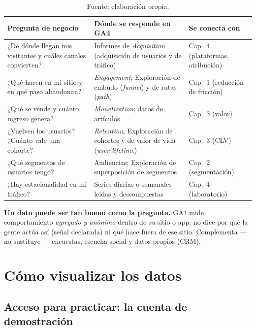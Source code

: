 \documentclass[11pt,letterpaper]{article}
\begin{document}
\begin{table}[h]
\centering
\small
\begin{tabularx}{\textwidth}{@{}>{\raggedright\arraybackslash}p{4.4cm}>{\raggedright\arraybackslash}X>{\raggedright\arraybackslash}p{2.9cm}@{}}
\toprule
\textbf{Pregunta de negocio} & \textbf{Dónde se responde en GA4} & \textbf{Se conecta con} \\
\midrule
¿De dónde llegan mis visitantes y cuáles canales convierten? & Informes de \emph{Acquisition} (adquisición de usuarios y de tráfico) & Cap.~4 (plataformas, atribución) \\
¿Qué hacen en mi sitio y en qué paso abandonan? & \emph{Engagement}; Exploración de embudo (\emph{funnel}) y de rutas (\emph{path}) & Cap.~1 (reducción de fricción) \\
¿Qué se vende y cuánto ingreso genera? & \emph{Monetization}; datos de artículos & Cap.~3 (valor) \\
¿Vuelven los usuarios? ¿Cuánto vale una cohorte? & \emph{Retention}; Exploración de cohortes y de valor de vida (\emph{user lifetime}) & Cap.~3 (CLV) \\
¿Qué segmentos de usuarios tengo? & Audiencias; Exploración de superposición de segmentos & Cap.~2 (segmentación) \\
¿Hay estacionalidad en mi tráfico? & Series diarias o semanales leídas y descompuestas & Cap.~4 (laboratorio) \\
\bottomrule
\end{tabularx}
\caption*{Fuente: elaboración propia.}
\end{table}

\begin{cajaNota}
\textbf{Un dato puede ser tan bueno como la pregunta.} GA4 mide comportamiento \emph{agregado y anónimo} dentro de \emph{su} sitio o app: no dice por qué la gente actúa así
(señal declarada) ni qué hace fuera de ese sitio. Complementa --- no sustituye --- encuestas, escucha social y datos propios (CRM).
\end{cajaNota}

\section{Cómo visualizar los datos}
\label{sec:visualizar}

\subsection{Acceso para practicar: la cuenta de demostración}
\end{document}
